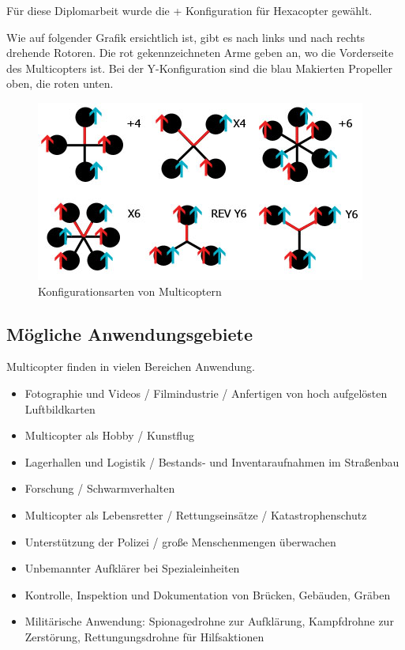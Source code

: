   Für diese Diplomarbeit wurde die + Konfiguration für Hexacopter gewählt.

  Wie auf folgender Grafik ersichtlich ist, gibt es nach links und nach rechts drehende Rotoren. Die rot gekennzeichneten Arme geben an, wo die Vorderseite des Multicopters ist. Bei der Y-Konfiguration sind die blau Makierten Propeller oben, die roten unten.

    \begin{figure}[H]
      \begin{centering}
        \includegraphics[width = \textwidth]{Bilder/bor_copter_konfig}
      \par\end{centering}
      \caption{Konfigurationsarten von Multicoptern}
      \label{Flussdiragramm}
    \end{figure}

  \subsection{Mögliche Anwendungsgebiete}
  Multicopter finden in vielen Bereichen Anwendung. \cite{copterAnwendung}
  \begin{itemize}
    \item Fotographie und Videos / Filmindustrie / Anfertigen von hoch aufgelösten Luftbildkarten
    \item Multicopter als Hobby / Kunstflug
    \item Lagerhallen und Logistik / Bestands- und Inventaraufnahmen im Straßenbau
    \item Forschung / Schwarmverhalten
    \item Multicopter als Lebensretter / Rettungseinsätze / Katastrophenschutz
    \item Unterstützung der Polizei / große Menschenmengen überwachen
    \item Unbemannter Aufklärer bei Spezialeinheiten
    \item Kontrolle, Inspektion und Dokumentation von Brücken, Gebäuden, Gräben
    \item Militärische Anwendung: Spionagedrohne zur Aufklärung, Kampfdrohne zur Zerstörung, Rettungungsdrohne für Hilfsaktionen
  \end{itemize}


